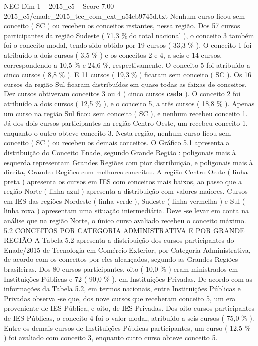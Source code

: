 \begin{textsample}{NEG Dim 1 – 2015\_c5 – Score 7.00 – 2015\_c5/enade\_2015\_tec\_com\_ext\_a54eb9745d.txt}
Nenhum curso ficou sem conceito ( SC ) ou recebeu os conceitos restantes, nessa região.
Dos 57 cursos participantes da região Sudeste ( 71,3 \% do total nacional ), o conceito 3 também foi o conceito modal, tendo sido obtido por 19 cursos ( 33,3 \% ).
O conceito 1 foi atribuído a dois cursos ( 3,5 \% ) e os conceitos 2 e 4, a seis e 14 cursos, correspondendo a 10,5 \% e 24,6 \%, respectivamente.
O conceito 5 foi atribuído a cinco cursos ( 8,8 \% ).
E 11 cursos ( 19,3 \% ) ficaram sem conceito ( SC ).
Os 16 cursos da região Sul ficaram distribuídos em quase todas as faixas de conceitos.
Dez cursos obtiveram conceitos 3 ou 4 ( cinco cursos \textbf{cada} ).
O conceito 2 foi atribuído a dois cursos ( 12,5 \% ), e o conceito 5, a três cursos ( 18,8 \% ).
Apenas um curso na região Sul ficou sem conceito ( SC ), e nenhum recebeu conceito 1.
Já dos dois cursos participantes na região Centro-Oeste, um recebeu conceito 1, enquanto o outro obteve conceito 3.
Nesta região, nenhum curso ficou sem conceito ( SC ) ou recebeu os demais conceitos.
O Gráfico 5.1 apresenta a distribuição do Conceito Enade, segundo Grande Região : poligonais mais à esquerda representam Grandes Regiões com pior distribuição, e poligonais mais à direita, Grandes Regiões com melhores conceitos.
A região Centro-Oeste ( linha preta ) apresenta os cursos em IES com conceitos mais baixos, ao passo que a região Norte ( linha azul ) apresenta a distribuição com valores maiores.
Cursos em IES das regiões Nordeste ( linha verde ), Sudeste ( linha vermelha ) e Sul ( linha roxa ) apresentam uma situação intermediária.
Deve -se levar em conta na análise que na região Norte, o único curso avaliado recebeu o conceito máximo. 5.2 CONCEITOS POR CATEGORIA ADMINISTRATIVA E POR GRANDE REGIÃO A Tabela 5.2 apresenta a distribuição dos cursos participantes do Enade/2015 de Tecnologia em Comércio Exterior, por Categoria Administrativa, de acordo com os conceitos por eles alcançados, segundo as Grandes Regiões brasileiras.
Dos 80 cursos participantes, oito ( 10,0 \% ) eram ministrados em Instituições Públicas e 72 ( 90,0 \% ), em Instituições Privadas.
De acordo com as informações da Tabela 5.2, em termos nacionais, entre Instituições Públicas e Privadas observa -se que, dos nove cursos que receberam conceito 5, um era proveniente de IES Pública, e oito, de IES Privadas.
Dos oito cursos participantes de IES Públicas, o conceito 4 foi o valor modal, atribuído a seis cursos ( 75,0 \% ).
Entre os demais cursos de Instituições Públicas participantes, um curso ( 12,5 \% ) foi avaliado com conceito 3, enquanto outro curso obteve conceito 5.

\end{textsample}
